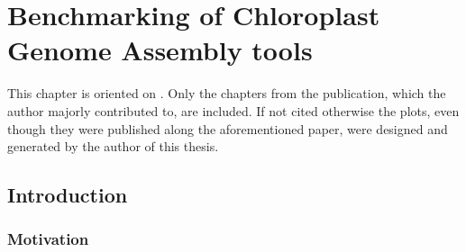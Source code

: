 \newcommand{\formatprogramnames}[1]{\texttt{#1}}
\newcommand{\ce}{\formatprogramnames{chloroExtractor}}
\newcommand{\oa}{\formatprogramnames{ORG.Asm}}
\newcommand{\fp}{\formatprogramnames{Fast-Plast}}
\newcommand{\ioga}{\formatprogramnames{IOGA}}
\newcommand{\np}{\formatprogramnames{NOVOPlasty}}
\newcommand{\go}{\formatprogramnames{GetOrganelle}}
\newcommand{\cassp}{\formatprogramnames{Chloroplast assembly protocol}}



\chapter{Benchmarking of Chloroplast Genome Assembly tools } %

\label{Chapter1} %
This chapter is oriented on \cite{freudenthal2019landscape}. Only the chapters from the publication, which
the author majorly contributed to, are included. If not cited otherwise the plots, even though they were
published along the aforementioned paper, were designed and generated by the author of this thesis.


\newcommand{\keyword}[1]{\textbf{#1}}
\newcommand{\tabhead}[1]{\textbf{#1}}
\newcommand{\code}[1]{\texttt{#1}}
\newcommand{\file}[1]{\texttt{\bfseries#1}}
\newcommand{\option}[1]{\texttt{\itshape#1}}


\section{Introduction} \label{intro:cp}
\subsection{Motivation}

